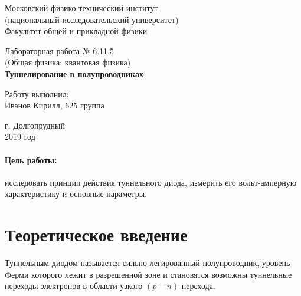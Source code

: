 \documentclass[12pt]{kiarticle} %
\begin{document}
	
	\begin{titlepage}
		\begin{center}
			\large 	Московский физико-технический институт \\
				(национальный исследовательский университет) \\
			Факультет общей и прикладной физики \\
			\vspace{0.2cm}
			
			\vspace{4.5cm}
			Лабораторная работа № 6.11.5 \\ \vspace{0.2cm}
			\large (Общая физика: квантовая физика) \\ \vspace{0.2cm}
			\LARGE \textbf{  Туннелирование в полупроводниках }
		\end{center}
		\vspace{2.3cm} \large
		
		\begin{center}
			Работу выполнил: \\
			Иванов Кирилл,
			625 группа
			\vspace{10mm}		
			
		\end{center}
		
		\begin{center} \vspace{60mm}
			г. Долгопрудный \\
			2019 год
		\end{center}
	\end{titlepage}


	\paragraph*{Цель работы:} исследовать принцип действия туннельного диода, измерить его вольт-амперную характеристику и основные параметры. 
	
	
	
	\section{Теоретическое введение}
	
	Туннельным диодом называется сильно легированный полупроводник, уровень Ферми которого лежит в разрешенной зоне и становятся возможны туннельные переходы электронов в области узкого $(p-n)$-перехода. 
	
\end{document}
